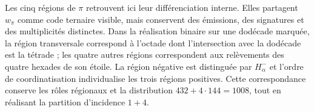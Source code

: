 Les cinq régions de $\pi$ retrouvent ici leur différenciation interne.
Elles partagent $w_\pi$ comme code ternaire visible, mais conservent des émissions,
des signatures et des multiplicités distinctes. Dans la réalisation binaire sur une
dodécade marquée, la région transversale correspond à l'octade dont
l'intersection avec la dodécade est la tétrade ; les quatre autres régions
correspondent aux relèvements des quatre hexades de son étoile. La
région négative est distinguée par $H^-_\alpha$ et l'ordre de coordinatisation
individualise les trois régions positives. Cette correspondance conserve
les rôles régionaux et la distribution $432+4\cdot144=1008$, tout en
réalisant la partition d'incidence $1+4$.
